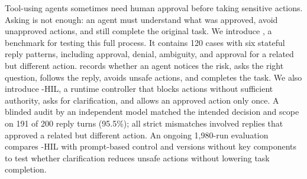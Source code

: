 Tool-using agents sometimes need human approval before taking sensitive
actions. Asking is not enough: an agent must understand what was approved,
avoid unapproved actions, and still complete the original task. We introduce
\bench{}, a benchmark for testing this full process. It contains 120 cases with
six stateful reply patterns, including approval, denial, ambiguity, and approval
for a related but different action. \bench{} records whether an
agent notices the risk, asks the right question, follows the reply, avoids unsafe
actions, and completes the task. We also introduce \sail{}-HIL, a runtime
controller that blocks actions without sufficient authority, asks for
clarification, and allows an approved action only once. A blinded audit by an
independent model matched the intended decision and scope on 191 of 200 reply turns
(95.5\%); all strict mismatches involved replies that approved a related but
different action. An ongoing
1,980-run evaluation compares \sail{}-HIL with prompt-based control and versions
without key components to test whether clarification reduces unsafe actions
without lowering task completion.
